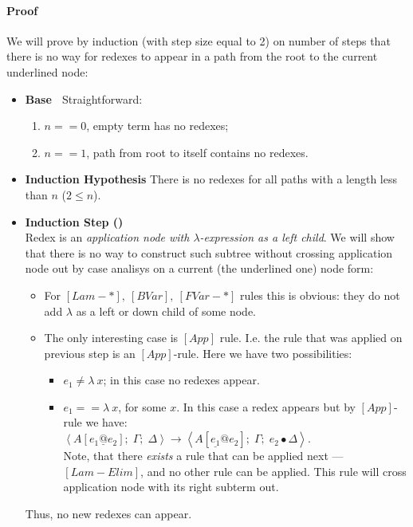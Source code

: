 \documentclass[a4paper, 10pt]{article}
\newcommand{\State}[1]{\left<{#1}\right>}
\newcommand{\InContext}[2]{{#1}\left[{#2}\right]}
\newcommand{\Rule}[2]{{#1}\longrightarrow{#2}}
\begin{document}
\paragraph{Proof}
We will prove by induction (with step size equal to 2) on number of steps that there is no way for redexes to appear in a path from the root to the current underlined node:
\begin{itemize}
\item \textbf{Base} $\;$ Straightforward:
  \begin{enumerate}
  \item $n == 0$, empty term has no redexes;
  \item $n == 1$, path from root to itself contains no redexes.
  \end{enumerate}
\item \textbf{Induction Hypothesis} There is no redexes for all paths with a length less than $n$ ($2 \leq n$).
\item \textbf{Induction Step ()}\\
  Redex is an \textit{application node with $\lambda$-expression as a left child}. We will show that there is no way to construct such subtree without crossing application node out by case analisys on a current (the underlined one) node form:
  \begin{itemize}
  \item For $[Lam-*],\ [BVar],\ [FVar-*]$ rules this is obvious: they do not add $\lambda$ as a left or down child of some node.
  \item The only interesting case is $[App]$ rule. I.e. the rule that was applied on previous step is an $[App]$-rule.
    Here we have two possibilities:
    \begin{itemize}
    \item $e_1 \ne \lambda\ x$; in this case no redexes appear.
    \item $e_1 == \lambda\ x$, for some $x$. In this case a redex appears but by $[App]$-rule we have:\\
      $\Rule{\State{\InContext{A}{e_1\underline{@}e_2};\;\Gamma;\;\Delta}}
       {\State{\InContext{A}{\underline{e_1}@e_2};\;\Gamma;\;e_2\bullet\Delta}}$.\\
      Note, that there \textit{exists} a rule that can be applied next --- $[Lam-Elim]$, and no other rule can be applied. This rule will cross application node with its right subterm out.\\
    \end{itemize}
  \end{itemize}
  Thus, no new redexes can appear.
\end{itemize}
\end{document}
